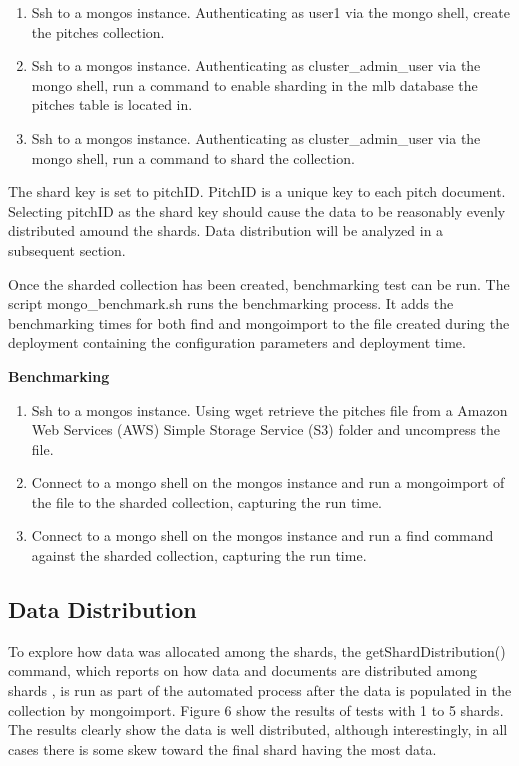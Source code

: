 \documentclass[9pt,twocolumn,twoside]{styles/osajnl}
\begin{document}
\vspace{-\topsep}
\begin{enumerate}
\item Ssh to a mongos instance.  Authenticating as user1 via the mongo shell, create the pitches collection.
\item Ssh to a mongos instance.  Authenticating as cluster\_admin\_user via the mongo shell, run a command to enable sharding in the mlb database the pitches table is located in.
\item Ssh to a mongos instance.  Authenticating as cluster\_admin\_user via the mongo shell, run a command to shard the collection.  
\end{enumerate}
\vspace{-\topsep}

The shard key is set to pitchID.  PitchID is a unique key to each pitch document.  Selecting pitchID as the shard key should cause the data to be reasonably evenly distributed amound the shards.  Data distribution will be analyzed in a subsequent section.

Once the sharded collection has been created, benchmarking test can be run.  The script mongo\_benchmark.sh runs the benchmarking process.  It adds the benchmarking times for both find and mongoimport to the file created during the deployment containing the configuration parameters and deployment time.

\textbf{Benchmarking}


\vspace{-\topsep}
\begin{enumerate}
\item Ssh to a mongos instance.  Using wget retrieve the pitches file from a Amazon Web Services (AWS) Simple Storage Service (S3) folder and uncompress the file.
\item Connect to a mongo shell on the mongos instance and run a mongoimport of the file to the sharded collection, capturing the run time.
\item Connect to a mongo shell on the mongos instance and run a find command against the sharded collection, capturing the run time. 
\end{enumerate}
\vspace{-\topsep}


\subsection{Data Distribution}

To explore how data was allocated among the shards, the getShardDistribution() command, which reports on how data and documents are distributed among shards \cite{www-shardDist}, is run as part of the automated process after the data is populated in the collection by mongoimport.  Figure 6 show the results of tests with 1 to 5 shards.  The results clearly show the data is well distributed, although interestingly, in all cases there is some skew toward the final shard having the most data.
\end{document}

